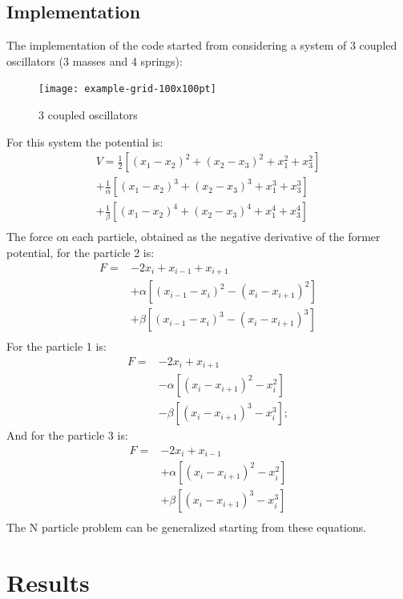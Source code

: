 \documentclass[12pt,a4paper,twocolumn]{article}
\begin{document}
\subsection{Implementation}
The implementation of the code started from considering a system of 3 coupled oscillators (3 masses and 4 springs):
\begin{figure}[h!]
	\texttt{[image: example-grid-100x100pt]}
	\caption{3 coupled oscillators}
\end{figure}
For this system the potential is:
\begin{equation}
	\begin{split}
	V=\frac{1}{2}[(x_1-x_2)^2+(x_2-x_3)^2+x_1^2+x_3^2]\\
	+\frac{1}{\alpha}[(x_1-x_2)^3+(x_2-x_3)^3+x_1^3+x_3^3]\\
	+\frac{1}{\beta}[(x_1-x_2)^4+(x_2-x_3)^4+x_1^4+x_3^4]\\
	\end{split}
\end{equation}
The force on each particle, obtained as the negative derivative of the former potential, for the particle 2 is:
\begin{equation}
	\begin{split}
	F=&-2x_i+x_{i-1}+x_{i+1}\\
	&+\alpha [ (x_{i-1}-x_{i})^2-(x_{i}-x_{i+1})^2]\\
	&+\beta [(x_{i-1}-x_{i})^3-(x_{i}-x_{i+1})^3]\\
	\end{split}
\end{equation}
For the particle 1 is:
\begin{equation}
	\begin{split}	
	F=&-2x_{i}+x_{i+1}\\
	&-\alpha[(x_{i}-x_{i+1})^2-x_{i}^2]\\
	&-\beta [(x_{i}-x_{i+1})^3-x_{i}^3];
	\end{split}
\end{equation}
And for the particle 3 is:
\begin{equation}
\begin{split}
	F=&-2x_{i}+x_{i-1}\\
	&+\alpha[(x_{i}-x_{i+1})^2-x_{i}^2]\\
	&+\beta[(x_{i}-x_{i+1})^3-x_{i}^3]\\
\end{split}
\end{equation}
The N particle problem can be generalized starting from these equations.
\section{Results}
\end{document}
